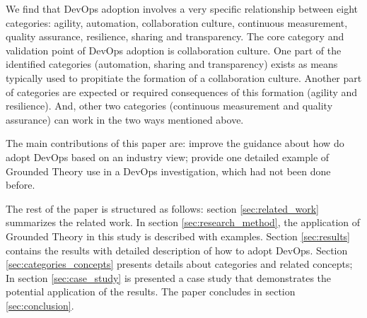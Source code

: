 We find that DevOps adoption involves a very specific relationship between eight categories: agility, automation, collaboration culture, continuous measurement, quality assurance, resilience, sharing and transparency. The core category and validation point of DevOps adoption is collaboration culture. One part of the identified categories (automation, sharing and transparency) exists as means typically used to propitiate the formation of a collaboration culture. Another part of categories are expected or required consequences of this formation (agility and resilience). And, other two categories (continuous measurement and quality assurance) can work in the two ways mentioned above.

The main contributions of this paper are: improve the guidance about how do adopt DevOps based on an industry view; provide one detailed example of Grounded Theory use in a DevOps investigation, which had not been done before.

The rest of the paper is structured as follows: section \ref{sec:related_work} summarizes the related work. In section \ref{sec:research_method}, the application of Grounded Theory in this study is described with examples. Section \ref{sec:results} contains the results with detailed description of how to adopt DevOps. Section \ref{sec:categories_concepts} presents details about categories and related concepts; In section \ref{sec:case_study} is presented a case study that demonstrates the potential application of the results. The paper concludes in section \ref{sec:conclusion}.
